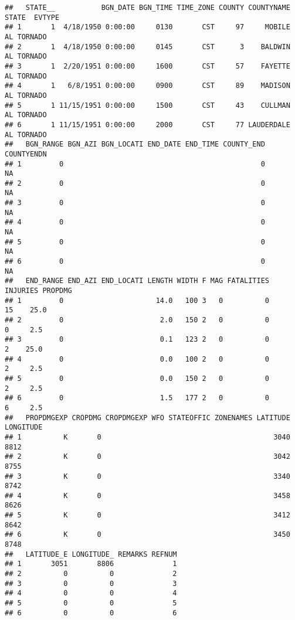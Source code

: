 \documentclass[
]{article}
\begin{document}
\begin{verbatim}
##   STATE__           BGN_DATE BGN_TIME TIME_ZONE COUNTY COUNTYNAME STATE  EVTYPE
## 1       1  4/18/1950 0:00:00     0130       CST     97     MOBILE    AL TORNADO
## 2       1  4/18/1950 0:00:00     0145       CST      3    BALDWIN    AL TORNADO
## 3       1  2/20/1951 0:00:00     1600       CST     57    FAYETTE    AL TORNADO
## 4       1   6/8/1951 0:00:00     0900       CST     89    MADISON    AL TORNADO
## 5       1 11/15/1951 0:00:00     1500       CST     43    CULLMAN    AL TORNADO
## 6       1 11/15/1951 0:00:00     2000       CST     77 LAUDERDALE    AL TORNADO
##   BGN_RANGE BGN_AZI BGN_LOCATI END_DATE END_TIME COUNTY_END COUNTYENDN
## 1         0                                               0         NA
## 2         0                                               0         NA
## 3         0                                               0         NA
## 4         0                                               0         NA
## 5         0                                               0         NA
## 6         0                                               0         NA
##   END_RANGE END_AZI END_LOCATI LENGTH WIDTH F MAG FATALITIES INJURIES PROPDMG
## 1         0                      14.0   100 3   0          0       15    25.0
## 2         0                       2.0   150 2   0          0        0     2.5
## 3         0                       0.1   123 2   0          0        2    25.0
## 4         0                       0.0   100 2   0          0        2     2.5
## 5         0                       0.0   150 2   0          0        2     2.5
## 6         0                       1.5   177 2   0          0        6     2.5
##   PROPDMGEXP CROPDMG CROPDMGEXP WFO STATEOFFIC ZONENAMES LATITUDE LONGITUDE
## 1          K       0                                         3040      8812
## 2          K       0                                         3042      8755
## 3          K       0                                         3340      8742
## 4          K       0                                         3458      8626
## 5          K       0                                         3412      8642
## 6          K       0                                         3450      8748
##   LATITUDE_E LONGITUDE_ REMARKS REFNUM
## 1       3051       8806              1
## 2          0          0              2
## 3          0          0              3
## 4          0          0              4
## 5          0          0              5
## 6          0          0              6
\end{verbatim}
\end{document}

